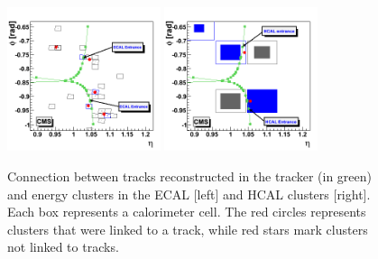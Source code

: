 \begin{figure}[!Hhtbp]
  \begin{center}
    \includegraphics[width=0.4\textwidth]{figs/Conection_tracks_Ecalcluster.png}
    \includegraphics[width=0.4\textwidth]{figs/Conection_tracks_Hcalcluster.png}
    \caption{Connection between tracks reconstructed in the tracker (in green) and energy clusters in the ECAL [left] and HCAL clusters [right]. Each box represents a calorimeter cell. The red circles represents clusters that were linked to a track, while red stars mark clusters not linked to tracks.}
    \label{fig:SubdetConec}
  \end{center}
\end{figure}
%
%
